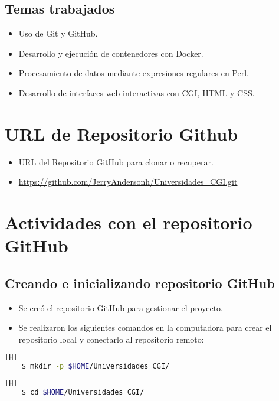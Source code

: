 \documentclass{article}
\begin{document}
    \subsection*{Temas trabajados}
    \begin{itemize}
        \item Uso de Git y GitHub.
        \item Desarrollo y ejecución de contenedores con Docker.
        \item Procesamiento de datos mediante expresiones regulares en Perl.
        \item Desarrollo de interfaces web interactivas con CGI, HTML y CSS.
    \end{itemize}
    
	\section{URL de Repositorio Github}
	\begin{itemize}
		\item URL del Repositorio GitHub para clonar o recuperar.
		\item \url{https://github.com/JerryAndersonh/Universidades_CGI.git}
	\end{itemize}
	
    \section{Actividades con el repositorio GitHub}
    
    \subsection{Creando e inicializando repositorio GitHub} 
    \begin{itemize} 
        \item Se creó el repositorio GitHub para gestionar el proyecto. 
        \item Se realizaron los siguientes comandos en la computadora para crear el repositorio local y conectarlo al repositorio remoto:
    \end{itemize}
    
    \begin{lstlisting}[language=bash,caption={Creando directorio de trabajo}][H]
    $ mkdir -p $HOME/Universidades_CGI/
    \end{lstlisting}
    
    \begin{lstlisting}[language=bash,caption={Dirigiéndonos al directorio de trabajo}][H]
    $ cd $HOME/Universidades_CGI/
    \end{lstlisting}
    
\end{document}
